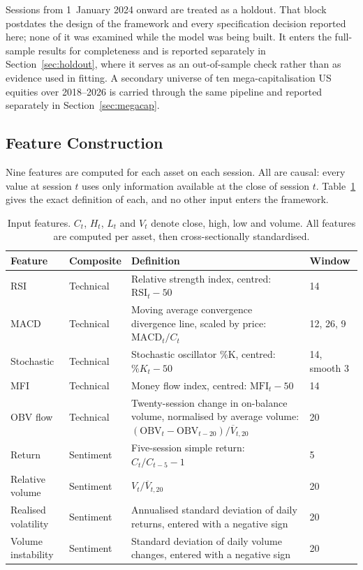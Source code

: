 Sessions from 1~January 2024 onward are treated as a holdout. That block postdates
the design of the framework and every specification decision reported here; none of
it was examined while the model was being built. It enters the full-sample results
for completeness and is reported separately in Section~\ref{sec:holdout}, where it
serves as an out-of-sample check rather than as evidence used in fitting. A secondary
universe of ten mega-capitalisation US equities over 2018--2026 is carried through the
same pipeline and reported separately in Section~\ref{sec:megacap}.

\subsection{Feature Construction}

Nine features are computed for each asset on each session. All are causal: every value
at session $t$ uses only information available at the close of session $t$. Table~\ref{tab:features}
gives the exact definition of each, and no other input enters the framework.

\begin{table}[!ht]
\centering
\caption{Input features. $C_t$, $H_t$, $L_t$ and $V_t$ denote close, high, low and
volume. All features are computed per asset, then cross-sectionally standardised.}
\label{tab:features}
\small
\begin{tabular}{p{2.0cm}p{1.8cm}p{5.2cm}p{1.5cm}}
\hline
\textbf{Feature} & \textbf{Composite} & \textbf{Definition} & \textbf{Window} \\
\hline
RSI & Technical & Relative strength index, centred: $\mathrm{RSI}_t - 50$ & 14 \\
\hline
MACD & Technical & Moving average convergence divergence line, scaled by price: $\mathrm{MACD}_t / C_t$ & 12, 26, 9 \\
\hline
Stochastic & Technical & Stochastic oscillator \%K, centred: $\%K_t - 50$ & 14, smooth 3 \\
\hline
MFI & Technical & Money flow index, centred: $\mathrm{MFI}_t - 50$ & 14 \\
\hline
OBV flow & Technical & Twenty-session change in on-balance volume, normalised by average volume: $(\mathrm{OBV}_t - \mathrm{OBV}_{t-20}) / \overline{V}_{t,20}$ & 20 \\
\hline
Return & Sentiment & Five-session simple return: $C_t / C_{t-5} - 1$ & 5 \\
\hline
Relative volume & Sentiment & $V_t / \overline{V}_{t,20}$ & 20 \\
\hline
Realised volatility & Sentiment & Annualised standard deviation of daily returns, entered with a negative sign & 20 \\
\hline
Volume instability & Sentiment & Standard deviation of daily volume changes, entered with a negative sign & 20 \\
\hline
\end{tabular}
\end{table}

